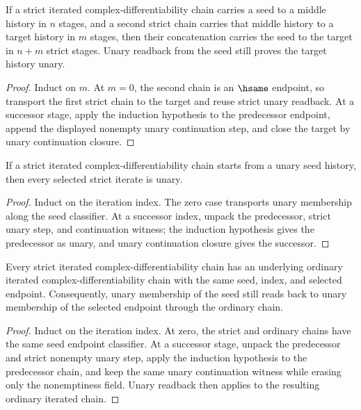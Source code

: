 \begin{theorem}
\label{thm:iterated-strict-cplx-diff-add-closed-strict-readback}
If a strict iterated complex-differentiability chain carries a seed to a middle
history in \(n\) stages, and a second strict chain carries that middle history
to a target history in \(m\) stages, then their concatenation carries the seed
to the target in \(n+m\) strict stages. Unary readback from the seed still
proves the target history unary.
\end{theorem}
\begin{proof}
Induct on \(m\). At \(m=0\), the second chain is an \(\hsame\) endpoint, so
transport the first strict chain to the target and reuse strict unary readback.
At a successor stage, apply the induction hypothesis to the predecessor
endpoint, append the displayed nonempty unary continuation step, and close the
target by unary continuation closure.
\end{proof}

\begin{theorem}
\label{thm:iterated-strict-cplxdiff-unary-of-seed}
If a strict iterated complex-differentiability chain starts from a unary seed
history, then every selected strict iterate is unary.
\end{theorem}
\begin{proof}
Induct on the iteration index. The zero case transports unary membership along
the seed classifier. At a successor index, unpack the predecessor, strict unary
step, and continuation witness; the induction hypothesis gives the predecessor
as unary, and unary continuation closure gives the successor.
\end{proof}

\begin{theorem}
\label{thm:iterated-strict-cplx-diff-forget-strict-unary-readback}
Every strict iterated complex-differentiability chain has an underlying
ordinary iterated complex-differentiability chain with the same seed, index,
and selected endpoint. Consequently, unary membership of the seed still reads
back to unary membership of the selected endpoint through the ordinary chain.
\end{theorem}
\begin{proof}
Induct on the iteration index. At zero, the strict and ordinary chains have
the same seed endpoint classifier. At a successor stage, unpack the predecessor
and strict nonempty unary step, apply the induction hypothesis to the
predecessor chain, and keep the same unary continuation witness while erasing
only the nonemptiness field. Unary readback then applies to the resulting
ordinary iterated chain.
\end{proof}

